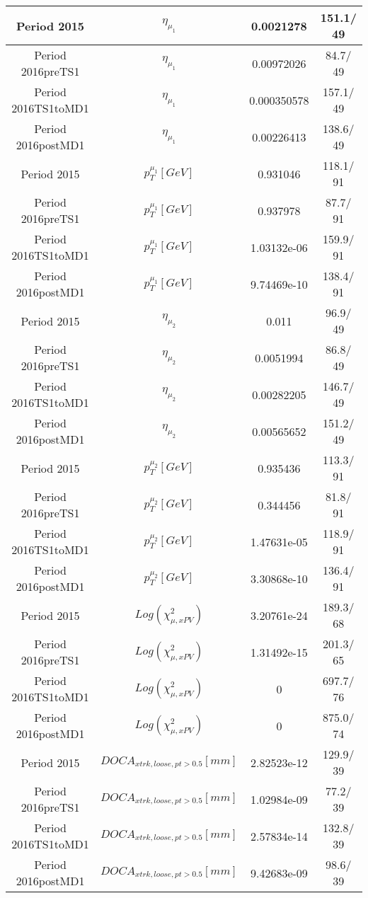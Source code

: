 \documentclass{article}
\begin{document}
\begin{longtable}{c|c|c|c}
\hline
 Period 2015 & $\eta_{\mu_{1}}$ & 0.0021278 & 151.1/ 49\\
\hline
 Period 2016preTS1 & $\eta_{\mu_{1}}$ & 0.00972026 &  84.7/ 49\\
\hline
 Period 2016TS1toMD1 & $\eta_{\mu_{1}}$ & 0.000350578 & 157.1/ 49\\
\hline
 Period 2016postMD1 & $\eta_{\mu_{1}}$ & 0.00226413 & 138.6/ 49\\
\hline
 Period 2015 & $p_{T}^{\mu_{1}} [GeV]$ & 0.931046 & 118.1/ 91\\
\hline
 Period 2016preTS1 & $p_{T}^{\mu_{1}} [GeV]$ & 0.937978 &  87.7/ 91\\
\hline
 Period 2016TS1toMD1 & $p_{T}^{\mu_{1}} [GeV]$ & 1.03132e-06 & 159.9/ 91\\
\hline
 Period 2016postMD1 & $p_{T}^{\mu_{1}} [GeV]$ & 9.74469e-10 & 138.4/ 91\\
\hline
 Period 2015 & $\eta_{\mu_{2}}$ & 0.011 &  96.9/ 49\\
\hline
 Period 2016preTS1 & $\eta_{\mu_{2}}$ & 0.0051994 &  86.8/ 49\\
\hline
 Period 2016TS1toMD1 & $\eta_{\mu_{2}}$ & 0.00282205 & 146.7/ 49\\
\hline
 Period 2016postMD1 & $\eta_{\mu_{2}}$ & 0.00565652 & 151.2/ 49\\
\hline
 Period 2015 & $p_{T}^{\mu_{2}} [GeV]$ & 0.935436 & 113.3/ 91\\
\hline
 Period 2016preTS1 & $p_{T}^{\mu_{2}} [GeV]$ & 0.344456 &  81.8/ 91\\
\hline
 Period 2016TS1toMD1 & $p_{T}^{\mu_{2}} [GeV]$ & 1.47631e-05 & 118.9/ 91\\
\hline
 Period 2016postMD1 & $p_{T}^{\mu_{2}} [GeV]$ & 3.30868e-10 & 136.4/ 91\\
\hline
 Period 2015 & $Log(\chi^{2}_{\mu,xPV})$ & 3.20761e-24 & 189.3/ 68\\
\hline
 Period 2016preTS1 & $Log(\chi^{2}_{\mu,xPV})$ & 1.31492e-15 & 201.3/ 65\\
\hline
 Period 2016TS1toMD1 & $Log(\chi^{2}_{\mu,xPV})$ & 0 & 697.7/ 76\\
\hline
 Period 2016postMD1 & $Log(\chi^{2}_{\mu,xPV})$ & 0 & 875.0/ 74\\
\hline
 Period 2015 & $DOCA_{xtrk, loose, pt>0.5} [mm]$ & 2.82523e-12 & 129.9/ 39\\
\hline
 Period 2016preTS1 & $DOCA_{xtrk, loose, pt>0.5} [mm]$ & 1.02984e-09 &  77.2/ 39\\
\hline
 Period 2016TS1toMD1 & $DOCA_{xtrk, loose, pt>0.5} [mm]$ & 2.57834e-14 & 132.8/ 39\\
\hline
 Period 2016postMD1 & $DOCA_{xtrk, loose, pt>0.5} [mm]$ & 9.42683e-09 &  98.6/ 39\\
\hline
\end{longtable}
\end{document}
